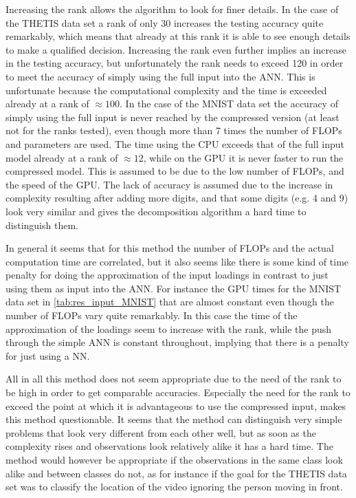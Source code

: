 Increasing the rank allows the algorithm to look for finer details. In the case of the THETIS data set a rank of only 30 increases the testing accuracy quite remarkably, which means that already at this rank it is able to see enough details to make a qualified decision. Increasing the rank even further implies an increase in the testing accuracy, but unfortunately the rank needs to exceed 120 in order to meet the accuracy of simply using the full input into the ANN. This is unfortunate because the computational complexity and the time is exceeded already at a rank of $\approx 100$. In the case of the MNIST data set the accuracy of simply using the full input is never reached by the compressed version (at least not for the ranks tested), even though more than 7 times the number of FLOPs and parameters are used. The time using the CPU exceeds that of the full input model already at a rank of $\approx 12$, while on the GPU it is never faster to run the compressed model. This is assumed to be due to the low number of FLOPs, and the speed of the GPU. The lack of accuracy is assumed due to the increase in complexity resulting after adding more digits, and that some digits (e.g. 4 and 9) look very similar and gives the decomposition algorithm a hard time to distinguish them.

In general it seems that for this method the number of FLOPs and the actual computation time are correlated, but it also seems like there is some kind of time penalty for doing the approximation of the input loadings in contrast to just using them as input into the ANN. For instance the GPU times for the MNIST data set in \autoref{tab:res_input_MNIST} that are almost constant even though the number of FLOPs vary quite remarkably. In this case the time of the approximation of the loadings seem to increase with the rank, while the push through the simple ANN is constant throughout, implying that there is a penalty for just using a NN.

All in all this method does not seem appropriate due to the need of the rank to be high in order to get comparable accuracies. Especially the need for the rank to exceed the point at which it is advantageous to use the compressed input, makes this method questionable. It seems that the method can distinguish very simple problems that look very different from each other well, but as soon as the complexity rises and observations look relatively alike it has a hard time. The method would however be appropriate if the observations in the same class look alike and between classes do not, as for instance if the goal for the THETIS data set was to classify the location of the video ignoring the person moving in front.

